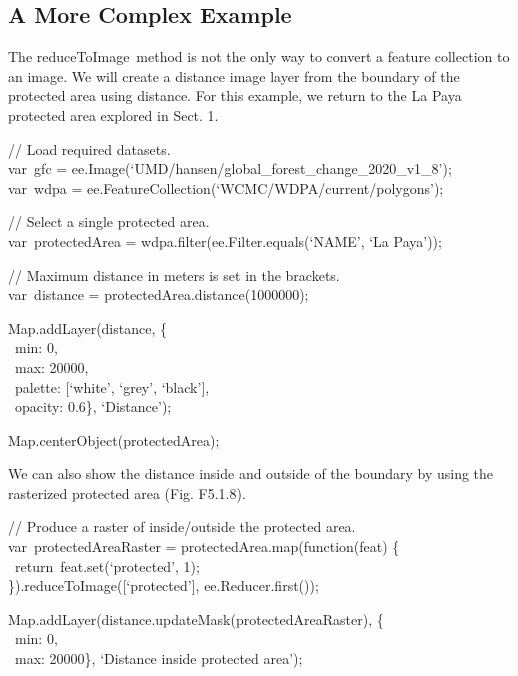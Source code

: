\documentclass[
  letterpaper,
  DIV=11,
  numbers=noendperiod]{scrreprt}
\begin{document}
\hypertarget{a-more-complex-example}{%
\subsection{A More Complex Example}\label{a-more-complex-example}}

The reduceToImage~method is not the only way to convert a feature
collection to an image. We will create a distance image layer from the
boundary of the protected area using distance. For this example, we
return to the La Paya protected area explored in Sect. 1.

// Load required datasets.\\
var~gfc = ee.Image(`UMD/hansen/global\_forest\_change\_2020\_v1\_8');\\
var~wdpa = ee.FeatureCollection(`WCMC/WDPA/current/polygons');

// Select a single protected area.\\
var~protectedArea = wdpa.filter(ee.Filter.equals(`NAME', `La Paya'));

// Maximum distance in meters is set in the brackets.\\
var~distance = protectedArea.distance(1000000);

Map.addLayer(distance, \{\\
\hspace*{0.333em} ~min: 0,\\
\hspace*{0.333em} ~max: 20000,\\
\hspace*{0.333em} ~palette: {[}`white', `grey', `black'{]},\\
\hspace*{0.333em} ~opacity: 0.6\}, `Distance');

Map.centerObject(protectedArea);

We can also show the distance inside and outside of the boundary by
using the rasterized protected area (Fig. F5.1.8).

// Produce a raster of inside/outside the protected area.\\
var~protectedAreaRaster = protectedArea.map(function(feat) \{~
~return~feat.set(`protected', 1);\\
\}).reduceToImage({[}`protected'{]}, ee.Reducer.first());

Map.addLayer(distance.updateMask(protectedAreaRaster), \{\\
\hspace*{0.333em} ~min: 0,\\
\hspace*{0.333em} ~max: 20000\}, `Distance inside protected area');
\end{document}
